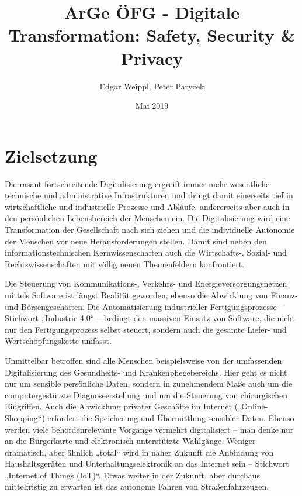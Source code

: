 \documentclass[11pt]{scrartcl}
\title{ArGe ÖFG - Digitale Transformation: Safety, Security \& Privacy}
\author{Edgar Weippl,  Peter Parycek}
\date{Mai 2019}
\begin{document}
\maketitle

    

\section{Zielsetzung}

Die rasant fortschreitende Digitalisierung ergreift immer mehr wesentliche technische und administrative Infrastrukturen und dringt damit einerseits tief in wirtschaftliche und industrielle Prozesse und Abläufe, andererseits aber auch in den persönlichen Lebensbereich der Menschen ein. Die Digitalisierung wird eine Transformation der Gesellschaft nach sich ziehen und die individuelle Autonomie der Menschen vor neue Herausforderungen stellen. Damit sind neben den informationstechnischen Kernwissenschaften auch die Wirtschafts-, Sozial- und Rechtswissenschaften mit völlig neuen Themenfeldern konfrontiert.

Die Steuerung von Kommunikations-, Verkehrs- und Energieversorgungsnetzen mittels Software ist längst Realität geworden, ebenso die Abwicklung von Finanz- und Börsengeschäften. Die Automatisierung industrieller Fertigungsprozesse – Stichwort „Industrie 4.0“ – bedingt den massiven Einsatz von Software, die nicht nur den Fertigungsprozess selbst steuert, sondern auch die gesamte Liefer- und Wertschöpfungskette umfasst.

Unmittelbar betroffen sind alle Menschen beispielsweise von der umfassenden Digitalisierung des Gesundheits- und Krankenpflegebereichs. Hier geht es nicht nur um sensible persönliche Daten, sondern in zunehmendem Maße auch um die computergestützte Diagnoseerstellung und um die Steuerung von chirurgischen Eingriffen. Auch die Abwicklung privater Geschäfte im Internet („Online- Shopping“) erfordert die Speicherung und Übermittlung sensibler Daten. Ebenso werden viele behördenrelevante Vorgänge vermehrt digitalisiert – man denke nur an die Bürgerkarte und elektronisch unterstützte Wahlgänge. Weniger dramatisch, aber ähnlich „total“ wird in naher Zukunft die Anbindung von Haushaltsgeräten und Unterhaltungselektronik an das Internet sein – Stichwort „Internet of Things (IoT)“. Etwas weiter in der Zukunft, aber durchaus mittelfristig zu erwarten ist das autonome Fahren von Straßenfahrzeugen.
\end{document}
